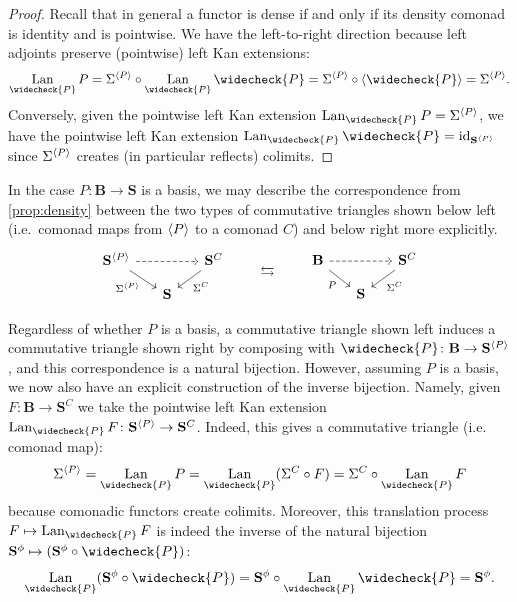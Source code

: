 \documentclass[11pt, oneside, article]{memoir}
\theoremstyle{plain}
\theoremstyle{definition}
\theoremstyle{remark}
\newenvironment{remark}
{\renewcommand\qedsymbol{$\lrcorner$}%
  \pushQED{\qed}\myremark}
{\popQED\endmyremark}
\DeclareMathOperator{\id}{id}
\DeclareMathOperator{\Lan}{Lan}
\DeclarePairedDelimiter{\gen}{\langle}{\rangle}
\newcommand{\cat}[1]{\mathbf{#1}}
\newcommand{\CoalgOn}[2]{{#2}^{#1}}
\newcommand{\CoalgS}[1]{\CoalgOn{#1}{\bS}}
\newcommand{\lift}[1]{\widecheck{#1}}
\newcommand{\carr}{\Sigma}
\newcommand{\car}[1]{\carr^{#1}}
\newcommand{\carC}{\car{\cC}}
\newcommand{\carP}{\car{\cP}}
\newcommand{\ph}[1]{#1}
\newcommand{\com}[2]{{#1}^{#2}}
\newcommand{\cmnd}[1]{{#1}}
\newcommand{\cC}{\cmnd{C}}
\newcommand{\bB}{\cat{B}}
\newcommand{\bS}{\cat{S}}
\newcommand{\pP}{\ph{P}}
\newcommand{\cP}{\gen{\pP}}
\newcommand{\lP}{\lift{\pP}}
\newcommand{\CS}{\CoalgS{\cC}}
\newcommand{\PS}{\CoalgS{\cP}}
\newcommand{\La}[2]{\Lan_{#1}#2}
\begin{document}
\begin{proof}
  Recall that in general a functor is dense if and only if its density
  comonad is identity and is pointwise. We have the
  left-to-right direction because left adjoints preserve (pointwise)
  left Kan extensions:
  \[\La{\lP}{\pP} = \carP \circ \La{\lP}{\lP} =
    \carP \circ \gen{\lP} = \carP.\] Conversely, given the pointwise
  left Kan extension $\La{\lP}{\pP} = \carP$, we have the pointwise
  left Kan extension $\La{\lP}{\lP} = \id_{\PS}$ since $\carP$
  creates (in particular reflects) colimits.
\end{proof}

\begin{remark}\label{rem:densityformula}
  In the case $\pP \colon \bB \to \bS$ is a basis, we may describe the
  correspondence from \cref{prop:density} between the two types of
  commutative triangles shown below left (i.e.\ comonad maps from
  $\cP$ to a comonad $\cC$) and below right more explicitly.
  \[
    \begin{tikzcd}[row sep=10pt,column sep=15pt]
      {\PS} && {\CS} \\
      & {\bS}
      \arrow[dashed, from=1-1, to=1-3]
      \arrow["\carP"', from=1-1, to=2-2]
      \arrow["\carC", from=1-3, to=2-2]
    \end{tikzcd}
    \qquad\leftrightarrows\qquad
    \begin{tikzcd}[row sep=10pt,column sep=15pt]
      {\bB} && {\CS} \\
      & {\bS}
      \arrow[dashed, from=1-1, to=1-3]
      \arrow["\pP"', from=1-1, to=2-2]
      \arrow["\carC", from=1-3, to=2-2]
    \end{tikzcd}\]

  Regardless of whether $\pP$ is a basis, a commutative triangle shown
  left induces a commutative triangle shown right by composing with
  $\lP \colon \bB \to \PS$, and this correspondence is a natural
  bijection. However, assuming $\pP$ is a basis, we now also have an
  explicit construction of the inverse bijection. Namely, given
  $F \colon \bB \to \CS$ we take the pointwise left Kan extension
  $\La{\lP}{F} \colon \PS \to \CS$. Indeed, this gives a commutative
  triangle (i.e. comonad map):
  \[\carP = \La{\lP}{\pP} = \La{\lP}{(\carC \circ F)} = \carC \circ
    \La{\lP}{F} \] because comonadic functors create
  colimits. Moreover, this translation process
  $F \mapsto \La{\lP}{F}$ is indeed the inverse of the natural
  bijection $\com{\bS}{\phi} \mapsto (\com{\bS}{\phi} \circ \lP)$:
  \[\La{\lP}{(\com{\bS}{\phi} \circ \lP)} = \com{\bS}{\phi} \circ 
    \La{\lP}{\lP} = \com{\bS}{\phi}.\]


\end{remark}
\end{document}
